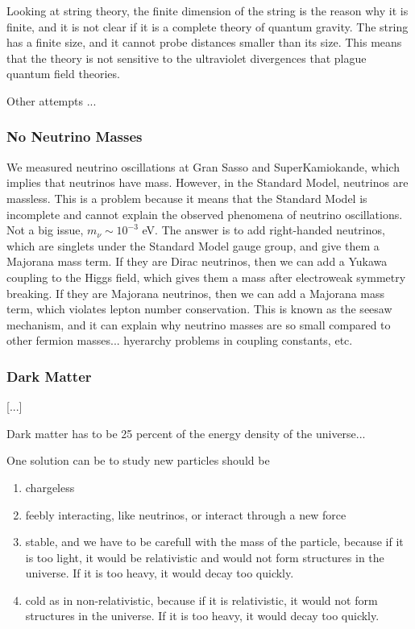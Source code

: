 Looking at string theory, the finite dimension of the string is the reason why it is finite, and it is not clear if it is a complete theory of quantum gravity. The string has a finite size, and it cannot probe distances smaller than its size. This means that the theory is not sensitive to the ultraviolet divergences that plague quantum field theories.

Other attempts ...

\subsubsection{No Neutrino Masses}

We measured neutrino oscillations at Gran Sasso and SuperKamiokande, which implies that neutrinos have mass. However, in the Standard Model, neutrinos are massless. This is a problem because it means that the Standard Model is incomplete and cannot explain the observed phenomena of neutrino oscillations. Not a big issue, \(m_\nu \sim 10^{-3} \) eV. The answer is to add right-handed neutrinos, which are singlets under the Standard Model gauge group, and give them a Majorana mass term. If they are Dirac neutrinos, then we can add a Yukawa coupling to the Higgs field, which gives them a mass after electroweak symmetry breaking. If they are Majorana neutrinos, then we can add a Majorana mass term, which violates lepton number conservation. This is known as the seesaw mechanism, and it can explain why neutrino masses are so small compared to other fermion masses... hyerarchy problems in coupling constants, etc.

\subsubsection{Dark Matter}

[...]

Dark matter has to be 25 percent of the energy density of the universe...

One solution can be to study new particles should be
\begin{enumerate}
    \item chargeless
    \item feebly interacting, like neutrinos, or interact through a new force
    \item stable, and we have to be carefull with the mass of the particle, because if it is too light, it would be relativistic and would not form structures in the universe. If it is too heavy, it would decay too quickly.
    \item cold as in non-relativistic, because if it is relativistic, it would not form structures in the universe. If it is too heavy, it would decay too quickly.
\end{enumerate}

